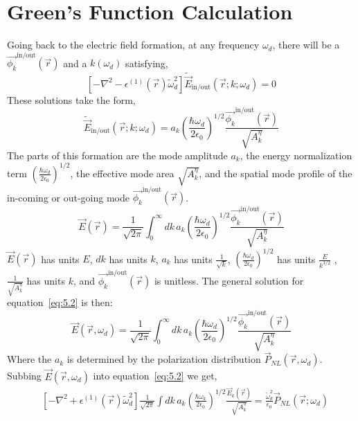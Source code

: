 \documentclass[12pt]{article}
\begin{document}
\section{Green's Function Calculation}
Going back to the electric field formation, at any frequency $\omega_d$, there will be a $\vec{\phi_k}^{\text{in/out}}(\vec{r})$ and a $k(\omega_d)$ satisfying,
\begin{equation*}
\left[ -\nabla^2 - \epsilon^{(1)}(\vec{r}) \tilde{\omega}_d^2 \right] \tilde{\vec{E}}_{\text{in/out}}(\vec{r}; k; \omega_d) = 0
\end{equation*}
These solutions take the form,
\begin{equation*}
\tilde{\vec{E}}_{\text{in/out}}(\vec{r}; k; \omega_d) = a_k \left( \frac{\hbar \omega_d}{2 \epsilon_0} \right)^{1/2} \frac{\vec{\phi_k}^{\text{in/out}}(\vec{r})}{\sqrt{A_k^\eta}}
\end{equation*}
The parts of this formation are the mode amplitude $a_k$, the energy normalization term $\left(\frac{\hbar\omega_d}{{2\epsilon_0}}\right)^{1/2}$, the effective mode area $\sqrt{A_k^\eta}$, and the spatial mode profile of the in-coming or out-going mode $\vec{\phi_k}^{\text{in/out}}(\vec{r})$.
\begin{equation*}
\vec{E}(\vec{r}) = \frac{1}{\sqrt{2\pi}} \int_0^\infty dk \, a_k \left( \frac{\hbar \omega_d}{2\epsilon_0} \right)^{1/2} \frac{\vec{\phi_k}^{\text{in/out}}(\vec{r})}{\sqrt{A_k^\eta}}
\end{equation*}
$\vec{E}(\vec{r})$ has units $E$, $dk$ has units $k$, $a_k$ has units $\frac{1}{\sqrt{k}}$, $\left(\frac{\hbar\omega_d}{{2\epsilon_0}}\right)^{1/2}$ has units $\frac{E}{k^{3/2}}$ , $\frac{1}{\sqrt{A_k^\eta}}$ has units $k$, and $\vec{\phi_k}^{\text{in/out}}(\vec{r})$ is unitless.
The general solution for equation~\ref{eq:5.2} is then:
\begin{equation*}
\vec{E}(\vec{r},\omega_d) = \frac{1}{\sqrt{2\pi}} \int_0^\infty dk \, a_k \left( \frac{\hbar \omega_d}{2\epsilon_0} \right)^{1/2} \frac{\vec{\phi_k}^{\text{in/out}}(\vec{r})}{\sqrt{A_k^\eta}}
\end{equation*}
Where the $a_k$ is determined by the polarization distribution $\vec{P}_{NL}(\vec{r},\omega_d )$.
Subbing $\vec{E}(\vec{r},\omega_d)$ into equation~\ref{eq:5.2} we get,
\begin{align*}
&\left[ -\nabla^2 + \epsilon^{(1)}(\vec{r}) \tilde{\omega}_d^2 \right] \frac{1}{\sqrt{2\pi}} \int dk \, a_k \left( \frac{\hbar \omega_k}{2\epsilon_0} \right)^{1/2} \frac{\vec{E}_k(\vec{r})}{\sqrt{A_k^\eta}} = \frac{\tilde{\omega}_d^2}{\epsilon_0} \vec{P}_{NL}(\vec{r}; \omega_d)
\end{align*}
\end{document}
